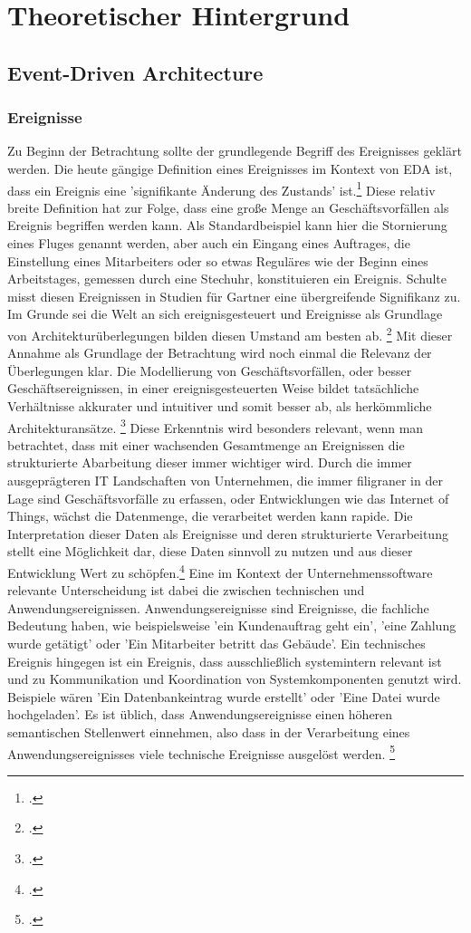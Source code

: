 \section{Theoretischer Hintergrund}
\subsection{Event-Driven Architecture}
\subsubsection*{Ereignisse}
Zu Beginn der Betrachtung sollte der grundlegende Begriff des Ereignisses geklärt werden. Die heute gängige Definition eines Ereignisses im Kontext von \ac*{EDA} ist, dass ein Ereignis eine 'signifikante Änderung des Zustands' ist.\footcite[Vgl.][S. 4]{EDA2006} Diese relativ breite Definition hat zur Folge, dass eine große Menge an Geschäftsvorfällen als Ereignis begriffen werden kann. Als Standardbeispiel kann hier die Stornierung eines Fluges genannt werden, aber auch ein Eingang eines Auftrages, die Einstellung eines Mitarbeiters oder so etwas Reguläres wie der Beginn eines Arbeitstages, gemessen durch eine Stechuhr, konstituieren ein Ereignis. Schulte misst diesen Ereignissen in Studien für Gartner eine übergreifende Signifikanz zu. Im Grunde sei die Welt an sich ereignisgesteuert und Ereignisse als Grundlage von Architekturüberlegungen bilden diesen Umstand am besten ab. \footcite[Vgl. ][S. 2]{schulte2003growing} Mit dieser Annahme als Grundlage der Betrachtung wird noch einmal die Relevanz der Überlegungen klar. Die Modellierung von Geschäftsvorfällen, oder besser Geschäftsereignissen, in einer ereignisgesteuerten Weise bildet tatsächliche Verhältnisse akkurater und intuitiver und somit besser ab, als herkömmliche Architekturansätze. \footcite[Vgl. ][S. 13]{EDA2010} Diese Erkenntnis wird besonders relevant, wenn man betrachtet, dass mit einer wachsenden Gesamtmenge an Ereignissen die strukturierte Abarbeitung dieser immer wichtiger wird. Durch die immer ausgeprägteren \ac{IT} Landschaften von Unternehmen, die immer filigraner in der Lage sind Geschäftsvorfälle zu erfassen, oder Entwicklungen wie das Internet of Things, wächst die Datenmenge, die verarbeitet werden kann rapide. Die Interpretation dieser Daten als Ereignisse und deren strukturierte Verarbeitung stellt eine Möglichkeit dar, diese Daten sinnvoll zu nutzen und aus dieser Entwicklung Wert zu schöpfen.\footcite[Vgl. ][S. 16]{EDA2010} 
Eine im Kontext der Unternehmenssoftware relevante Unterscheidung ist dabei die zwischen technischen und Anwendungsereignissen. Anwendungsereignisse sind Ereignisse, die fachliche Bedeutung haben, wie beispielsweise 'ein Kundenauftrag geht ein', 'eine Zahlung wurde getätigt' oder 'Ein Mitarbeiter betritt das Gebäude'. Ein technisches Ereignis hingegen ist ein Ereignis, dass ausschließlich systemintern relevant ist und zu Kommunikation und Koordination von Systemkomponenten genutzt wird. Beispiele wären 'Ein Datenbankeintrag wurde erstellt' oder 'Eine Datei wurde hochgeladen'. Es ist üblich, dass Anwendungsereignisse einen höheren semantischen Stellenwert einnehmen, also dass in der Verarbeitung eines Anwendungsereignisses viele technische Ereignisse ausgelöst werden. \footcite[Vgl. ][S. 245f]{CLOUD2021}
